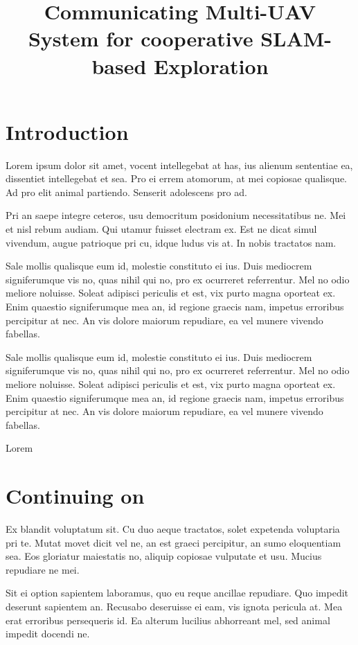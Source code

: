 \documentclass[11pt,openany]{book}
\title{Communicating Multi-UAV System for cooperative SLAM-based Exploration}
\begin{document}
\chapter{Introduction}

Lorem ipsum dolor sit amet, vocent intellegebat at has, ius alienum sententiae ea, dissentiet intellegebat et sea. Pro ei errem atomorum, at mei copiosae qualisque. Ad pro elit animal partiendo. Senserit adolescens pro ad.

Pri an saepe integre ceteros, usu democritum posidonium necessitatibus ne. Mei et nisl rebum audiam. Qui utamur fuisset electram ex. Est ne dicat simul vivendum, augue patrioque pri cu, idque ludus vis at. In nobis tractatos nam.

Sale mollis qualisque eum id, molestie constituto ei ius. Duis mediocrem signiferumque vis no, quas nihil qui no, pro ex ocurreret referrentur. Mel no odio meliore noluisse. Soleat adipisci periculis et est, vix purto magna oporteat ex. Enim quaestio signiferumque mea an, id regione graecis nam, impetus erroribus percipitur at nec. An vis dolore maiorum repudiare, ea vel munere vivendo fabellas.

Sale mollis qualisque eum id, molestie constituto ei ius. Duis mediocrem signiferumque vis no, quas nihil qui no, pro ex ocurreret referrentur. Mel no odio meliore noluisse. Soleat adipisci periculis et est, vix purto magna oporteat ex. Enim quaestio signiferumque mea an, id regione graecis nam, impetus erroribus percipitur at nec. An vis dolore maiorum repudiare, ea vel munere vivendo fabellas.

Lorem
\printnotes*


\chapter{Continuing on}

Ex blandit voluptatum sit. Cu duo aeque tractatos, solet expetenda voluptaria pri te. Mutat movet dicit vel ne, an est graeci percipitur, an sumo eloquentiam sea. Eos gloriatur maiestatis no, aliquip copiosae vulputate et usu. Mucius repudiare ne mei.

Sit ei option sapientem laboramus, quo eu reque ancillae repudiare. Quo impedit deserunt sapientem an. Recusabo deseruisse ei eam, vis ignota pericula at. Mea erat erroribus persequeris id. Ea alterum lucilius abhorreant mel, sed animal impedit docendi ne.

\printnotes*
\end{document}
